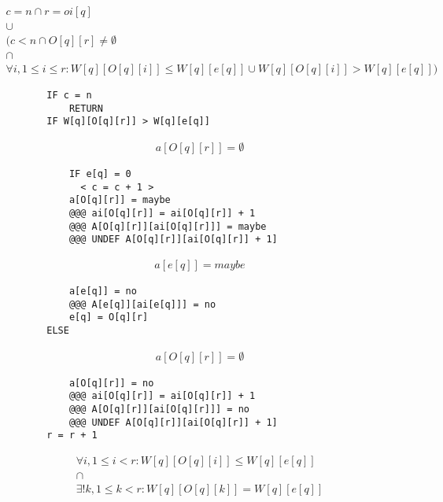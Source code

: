 \documentclass{article}
\begin{document}
\begin{displaymath}
\begin{array}{c}
c = n \cap r = oi[q] \\
\cup \\
(c < n \cap O[q][r] \neq \emptyset \\
\cap \\
\forall i, 1 \leq i \leq r : W[q][O[q][i]] \leq W[q][e[q]] \cup W[q][O[q][i]] > W[q][e[q]])
\end{array}
\end{displaymath}
\begin{verbatim}
        IF c = n
            RETURN
        IF W[q][O[q][r]] > W[q][e[q]]
\end{verbatim}
\begin{displaymath}
\begin{array}{c}
a[O[q][r]] = \emptyset
\end{array}
\end{displaymath}
\begin{verbatim}
            IF e[q] = 0
              < c = c + 1 >
            a[O[q][r]] = maybe
            @@@ ai[O[q][r]] = ai[O[q][r]] + 1
            @@@ A[O[q][r]][ai[O[q][r]]] = maybe
            @@@ UNDEF A[O[q][r]][ai[O[q][r]] + 1]
\end{verbatim}
\begin{displaymath}
\begin{array}{c}
a[e[q]] = maybe
\end{array}
\end{displaymath}
\begin{verbatim}
            a[e[q]] = no
            @@@ A[e[q]][ai[e[q]]] = no
            e[q] = O[q][r]
        ELSE
\end{verbatim}
\begin{displaymath}
\begin{array}{c}
a[O[q][r]] = \emptyset
\end{array}
\end{displaymath}
\begin{verbatim}
            a[O[q][r]] = no
            @@@ ai[O[q][r]] = ai[O[q][r]] + 1
            @@@ A[O[q][r]][ai[O[q][r]]] = no
            @@@ UNDEF A[O[q][r]][ai[O[q][r]] + 1]
        r = r + 1
\end{verbatim}
\begin{displaymath}
\begin{array}{c}
\forall i, 1 \leq i < r : W[q][O[q][i]] \leq W[q][e[q]] \\
\cap \\
\exists ! k, 1 \leq k < r : W[q][O[q][k]] = W[q][e[q]] \\
\end{array}
\end{displaymath}
\end{document}
